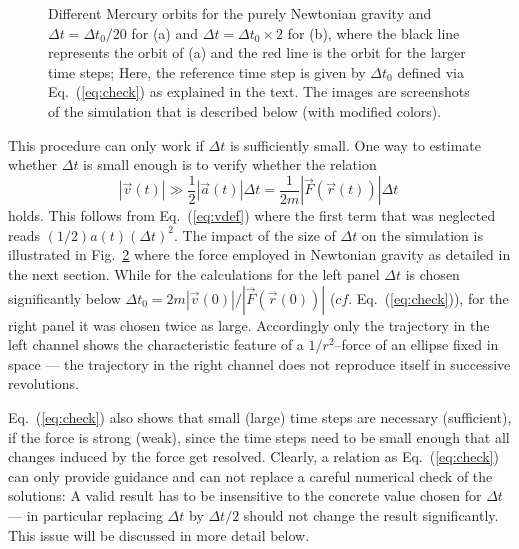 \documentclass[12pt,ngerman,american]{iopart}
\begin{document}
\begin{figure}[htb]
\begin{subfigure}[c]{0.22\textwidth}
		\caption{\label{fig:MercuryOrbit-a0-small-dt-large}}
	\end{subfigure}
	\captionsetup{singlelinecheck=off}
	\caption[]{\label{fig:MercuryOrbit1}
		Different Mercury orbits for the purely Newtonian gravity and
		 $\Delta t = \Delta t_0  / 20$ for (a) and $\Delta t = \Delta t_0  \times 2$ for (b), 
		 where the black line represents the orbit of (a) and the red line is the orbit for the larger time steps;
		Here, the reference time step is given by $\Delta t_0$ defined via Eq.~(\ref{eq:check}) as explained
		in the text.
		The images are screenshots of the simulation that is described below (with modified colors).
	}
\end{figure}

This procedure can only work if $\Delta t$ is sufficiently small.
One way to estimate whether $\Delta t$ is small enough is to verify whether the relation
\begin{equation}
|\vec v(t)| \gg \frac12|\vec a(t)|\Delta t = \frac{1}{2m} |\vec F(\vec r(t)) |\Delta t\
\label{eq:check}
\end{equation}
holds. This follows from Eq.~(\ref{eq:vdef}) where the first term that was neglected reads $(1/2)a(t){(\Delta t)}^2$.
The impact of the size of $\Delta t$ on the simulation is illustrated in Fig.~\ref{fig:MercuryOrbit1} where
the force employed in Newtonian gravity as detailed in the next section. While for the
calculations for the left panel $\Delta t$
is chosen significantly below $\Delta t_0=2m |\vec v(0)| /   |\vec F(\vec r(0)) |$ ($cf.$ Eq.~(\ref{eq:check})), for the
right panel it was chosen twice as large. Accordingly only the trajectory in the left channel shows the characteristic
feature of a $1/r^2$--force of an ellipse fixed in space --- the trajectory in the right channel does not reproduce itself in successive revolutions.  

Eq.~({\ref{eq:check}}) also shows that small (large) time steps are necessary (sufficient), if the force is strong (weak), since the time steps need to be small enough that all changes induced by the force get resolved.
Clearly, a relation as Eq.~({\ref{eq:check}}) can only provide guidance and can not replace a careful numerical check of the solutions: A valid result has to be insensitive to the concrete value chosen for $\Delta t$ --- in particular replacing $\Delta t$ by $\Delta t/2$ should not change the result significantly.
This issue will be discussed in more detail below.



\end{document}
